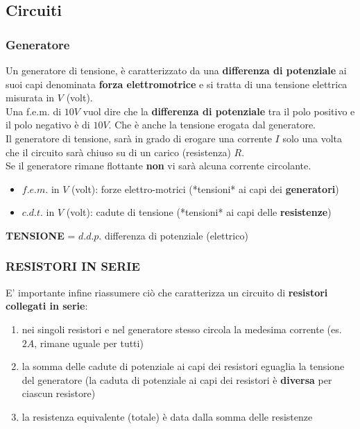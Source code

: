 \documentclass{article}
\begin{document}
\subsection{Circuiti}
\subsubsection{Generatore}

Un generatore di tensione, è caratterizzato da una \textbf{differenza di potenziale} ai suoi capi denominata \textbf{forza elettromotrice} e si tratta di una tensione elettrica misurata in $V$ (volt).\\
Una f.e.m. di $10V$ vuol dire che la \textbf{differenza di potenziale} tra il polo positivo e il polo negativo è di $10V$. Che è anche la tensione erogata dal generatore.\\
Il generatore di tensione, sarà in grado di erogare una corrente $I$ solo una volta che il circuito sarà chiuso su di un carico (resistenza) $R$. \\
Se il generatore rimane flottante \textbf{non} vi sarà alcuna corrente circolante.
\begin{itemize}
  \item $f.e.m.$ in $V$ (volt): forze elettro-motrici (*tensioni* ai capi dei \textbf{generatori})
  \item $c.d.t.$ in $V$ (volt): cadute di tensione (*tensioni* ai capi delle \textbf{resistenze})
\end{itemize}


\textbf{TENSIONE} = $d.d.p.$ differenza di potenziale (elettrico)

\subsubsection{RESISTORI IN SERIE}
E' importante infine riassumere ciò che caratterizza un circuito di \textbf{resistori collegati in serie}:    
\begin{enumerate}
  \item nei singoli resistori e nel generatore stesso circola la medesima corrente (es. $2A$, rimane uguale per tutti)
  \item la somma delle cadute di potenziale ai capi dei resistori eguaglia la tensione del generatore (la caduta di potenziale ai capi dei resistori è \textbf{diversa} per ciascun resistore)
  \item la resistenza equivalente (totale) è data dalla somma delle resistenze
\end{enumerate}
\end{document}

